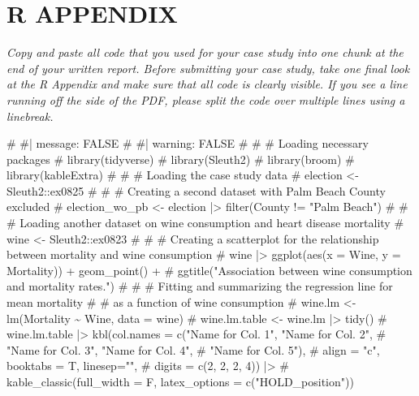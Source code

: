 \documentclass[
  letterpaper,
  DIV=11,
  numbers=noendperiod]{scrartcl}
\newenvironment{Shaded}{\begin{snugshade}}{\end{snugshade}}
\newcommand{\CommentTok}[1]{\textcolor[rgb]{0.37,0.37,0.37}{#1}}
\begin{document}
\hypertarget{r-appendix}{%
\section{R APPENDIX}\label{r-appendix}}

\emph{Copy and paste all code that you used for your case study into one
chunk at the end of your written report. Before submitting your case
study, take one final look at the R Appendix and make sure that all code
is clearly visible. If you see a line running off the side of the PDF,
please split the code over multiple lines using a linebreak.}

\begin{Shaded}
\begin{Highlighting}[]
\CommentTok{\# \#| message: FALSE}
\CommentTok{\# \#| warning: FALSE}
\CommentTok{\# }
\CommentTok{\# \# Loading necessary packages}
\CommentTok{\# library(tidyverse)}
\CommentTok{\# library(Sleuth2)}
\CommentTok{\# library(broom)        }
\CommentTok{\# library(kableExtra)   }
\CommentTok{\# }
\CommentTok{\# \# Loading the case study data}
\CommentTok{\# election \textless{}{-} Sleuth2::ex0825}
\CommentTok{\# }
\CommentTok{\# \# Creating a second dataset with Palm Beach County excluded}
\CommentTok{\# election\_wo\_pb \textless{}{-} election |\textgreater{} filter(County != "Palm Beach")}
\CommentTok{\# }
\CommentTok{\# \# Loading another dataset on wine consumption and heart disease mortality}
\CommentTok{\# wine \textless{}{-} Sleuth2::ex0823}
\CommentTok{\# }
\CommentTok{\# \# Creating a scatterplot for the relationship between mortality and wine consumption}
\CommentTok{\# wine |\textgreater{} ggplot(aes(x = Wine, y = Mortality)) + geom\_point() + }
\CommentTok{\#   ggtitle("Association between wine consumption and mortality rates.")}
\CommentTok{\# }
\CommentTok{\# \# Fitting and summarizing the regression line for mean mortality }
\CommentTok{\# \# as a function of wine consumption}
\CommentTok{\# wine.lm \textless{}{-} lm(Mortality \textasciitilde{} Wine, data = wine)}
\CommentTok{\# wine.lm.table \textless{}{-} wine.lm |\textgreater{} tidy()}
\CommentTok{\# wine.lm.table |\textgreater{} kbl(col.names = c("Name for Col. 1", "Name for Col. 2", }
\CommentTok{\#                                    "Name for Col. 3", "Name for Col. 4", }
\CommentTok{\#                                    "Name for Col. 5"), }
\CommentTok{\#                      align = "c", booktabs = T, linesep="", }
\CommentTok{\#                      digits = c(2, 2, 2, 4)) |\textgreater{} }
\CommentTok{\#   kable\_classic(full\_width = F, latex\_options = c("HOLD\_position"))}
\end{Highlighting}
\end{Shaded}
\end{document}
